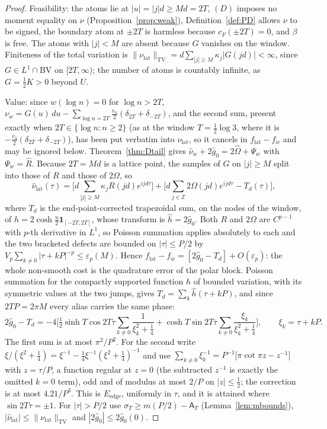 \documentclass[11pt]{amsart}
\theoremstyle{definition}
\theoremstyle{remark}
\newcommand{\Z}{\mathbb Z}
\newcommand{\TV}{\operatorname{TV}}
\newcommand{\sT}{\sigma_T}
\newcommand{\gh}[1]{\widehat g_{#1}}
\newcommand{\nuh}{\widehat\nu}
\newcommand{\cF}{c_F}
\newcommand{\Aconst}{\mathsf A_T}
\begin{document}
\begin{proof}
Feasibility: the atoms lie at $|u|=|j|d\ge Md=2T$, $(D)$ imposes no moment equality on $\nu$
(Proposition~\ref{prop:weak}), Definition~\ref{def:PD} allows $\nu$ to be signed, the boundary atom
at $\pm2T$ is harmless because $\cF(\pm2T)=0$, and $\beta$ is free. The atoms with $|j|<M$ are absent
because $G$ vanishes on the window. Finiteness of the total variation is
$\|\nu_{\mathrm{lat}}\|_{\TV}=d\sum_{|j|\ge M}\kappa_j|G(jd)|<\infty$, since $G\in L^1\cap
\mathrm{BV}$ on $[2T,\infty)$; the number of atoms is countably infinite, as $G=\frac12K>0$ beyond
$U$.

Value: since $w(\log n)=0$ for $\log n>2T$, $\nu_w=G(u)\,du-\sum_{\log n=2T}\frac{v_n}2(\delta_{2T}+\delta_{-2T})$,
and the second sum, present exactly when $2T\in\{\log n:n\ge2\}$ (as at the window $T=\frac12\log3$,
where it is $-\frac{v_3}2(\delta_{2T}+\delta_{-2T})$), has been put verbatim into
$\nu_{\mathrm{lat}}$, so it cancels in $f_{\mathrm{lat}}-f_w$ and may be ignored below.
Theorem~\ref{thm:Dtail}
gives $\nuh_w+2\gh0=2\widehat\Omega+\Psi_w$ with $\Psi_w=\widehat R$. Because $2T=Md$ is a lattice point,
the samples of $G$ on $|j|\ge M$ split into those of $R$ and those of $2\Omega$, so
\[
\nuh_{\mathrm{lat}}(\tau)=\Big[d\sum_{|j|\ge M}\kappa_jR(jd)e^{ijd\tau}\Big]
+\Big[d\sum_{j\in\Z}2\Omega(jd)e^{ijd\tau}-T_d(\tau)\Big],
\]
where $T_d$ is the end-point-corrected trapezoidal sum, on the nodes of the window, of
$h=2\cosh\frac u2\mathbf 1_{[-2T,2T]}$, whose transform is $\widehat h=2\gh0$. Both $R$ and $2\Omega$ are
$C^{p-1}$ with $p$-th derivative in $L^1$, so Poisson summation applies absolutely to each and the
two bracketed defects are bounded on $|\tau|\le P/2$ by
$V_p\sum_{k\ne0}|\tau+kP|^{-p}\le\varepsilon_p(M)$. Hence
$f_{\mathrm{lat}}-f_w=[2\gh0-T_d]+O(\varepsilon_p)$: the whole non-smooth cost is the quadrature
error of the polar block. Poisson summation for the compactly supported function $h$ of bounded
variation, with its symmetric values at the two jumps, gives $T_d=\sum_k\widehat h(\tau+kP)$, and
since $2TP=2\pi M$ every alias carries the same phase:
\[
2\gh0-T_d=-4\Big[\tfrac12\sinh T\cos2T\tau\sum_{k\ne0}\frac1{\xi_k^2+\frac14}
+\cosh T\sin2T\tau\sum_{k\ne0}\frac{\xi_k}{\xi_k^2+\frac14}\Big],\qquad\xi_k=\tau+kP .
\]
The first sum is at most $\pi^2/P^2$. For the second write
$\xi/(\xi^2+\frac14)=\xi^{-1}-\frac14\xi^{-1}(\xi^2+\frac14)^{-1}$ and use
$\sum_{k\ne0}\xi_k^{-1}=P^{-1}\big[\pi\cot\pi z-z^{-1}\big]$ with $z=\tau/P$, a function
regular at $z=0$ (the subtracted $z^{-1}$ is exactly the omitted $k=0$ term), odd and of
modulus at most $2/P$ on $|z|\le\frac12$; the correction is at most $4.21/P^3$. This is
$E_{\mathrm{edge}}$, uniformly in $\tau$, and it is attained where $\sin2T\tau=\pm1$. For
$|\tau|>P/2$ use $\sT\ge m(P/2)-\Aconst$ (Lemma~\ref{lem:mbounds}),
$|\nuh_{\mathrm{lat}}|\le\|\nu_{\mathrm{lat}}\|_{\TV}$ and $|2\gh0|\le2\gh0(0)$.
\end{proof}
\end{document}
